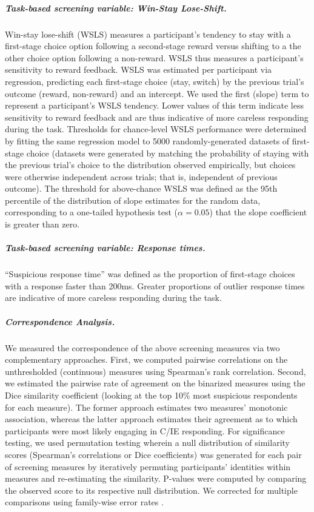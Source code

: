 \documentclass[a4paper,notitlepage,12pt]{article}
\begin{document}
\begin{refsection}[supp]
\subparagraph{Task-based screening variable: Win-Stay Lose-Shift.} Win-stay lose-shift (WSLS) measures a participant's tendency to stay with a first-stage choice option following a second-stage reward versus shifting to a the other choice option following a non-reward. WSLS thus measures a participant's sensitivity to reward feedback. WSLS was estimated per participant via regression, predicting each first-stage choice (stay, switch) by the previous trial's outcome (reward, non-reward) and an intercept. We used the first (slope) term to represent a participant's WSLS tendency. Lower values of this term indicate less sensitivity to reward feedback and are thus indicative of more careless responding during the task. Thresholds for chance-level WSLS performance were determined by fitting the same regression model to 5000 randomly-generated datasets of first-stage choice (datasets were generated by matching the probability of staying with the previous trial's choice to the distribution observed empirically, but choices were otherwise independent across trials; that is, independent of previous outcome). The threshold for above-chance WSLS was defined as the 95th percentile of the distribution of slope estimates for the random data, corresponding to a one-tailed hypothesis test ($\alpha = 0.05$) that the slope coefficient is greater than zero. 

\subparagraph{Task-based screening variable: Response times.} ``Suspicious response time'' was defined as the proportion of first-stage choices with a response faster than 200ms. Greater proportions of outlier response times are indicative of more careless responding during the task.

\subparagraph{Correspondence Analysis.} We measured the correspondence of the above screening measures via two complementary approaches. First, we computed pairwise correlations on the unthresholded (continuous) measures using Spearman's rank correlation. Second, we estimated the pairwise rate of agreement on the binarized measures using the Dice similarity coefficient (looking at the top 10\% most suspicious respondents for each measure). The former approach estimates two measures' monotonic association, whereas the latter approach estimates their agreement as to which participants were most likely engaging in C/IE responding. For significance testing, we used permutation testing wherein a null distribution of similarity scores (Spearman's correlations or Dice coefficients) was generated for each pair of screening measures by iteratively permuting participants' identities within measures and re-estimating the similarity. P-values were computed by comparing the observed score to its respective null distribution. We corrected for multiple comparisons using family-wise error rates \cite{winkler2014permutation-2}.


\end{refsection}
\end{document}
